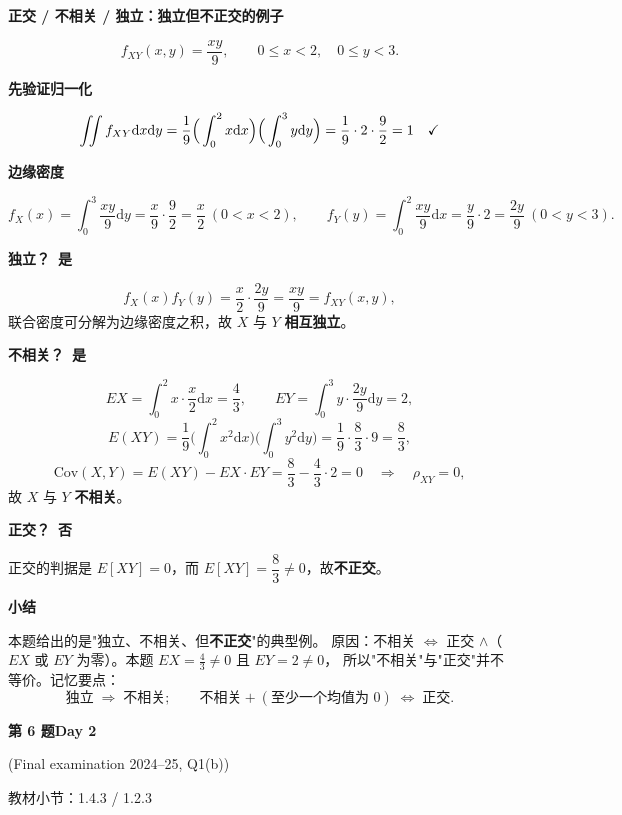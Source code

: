 \documentclass[10.5pt,fontset=fandol]{ctexart}
\newcommand{\key}[1]{\par\vspace{4pt}\noindent\textbf{\color{navy}#1}\par\vspace{2pt}}
\newcommand{\dd}{\mathrm d}\newcommand{\Var}{\operatorname{Var}}\newcommand{\Cov}{\operatorname{Cov}}
\newcommand{\qtitle}[2]{\par\addvspace{1.2em}\Needspace{8\baselineskip}\begin{tcolorbox}[colback=navy,colframe=navy,arc=1.5pt,boxrule=0pt]\color{white}\large\bfseries #1\hfill\small #2\end{tcolorbox}}
\begin{document}
\noindent\textbf{正交 / 不相关 / 独立：独立但不正交的例子}\par\smallskip\begin{tcolorbox}[breakable,colback=qbg,colframe=qbg,boxrule=0pt]\[
f_{XY}(x,y)=\frac{xy}{9},\qquad 0\le x<2,\quad 0\le y<3 .
\]

\key{先验证归一化}
\[
\iint f_{XY}\dd x\dd y=\frac19\Big(\int_0^2x\dd x\Big)\Big(\int_0^3y\dd y\Big)=\frac19\cdot2\cdot\frac92=1 \quad\text{\checkmark}
\]

\key{边缘密度}
\[
f_X(x)=\int_0^3\frac{xy}{9}\dd y=\frac{x}{9}\cdot\frac92=\frac{x}{2}\ (0<x<2),
\qquad
f_Y(y)=\int_0^2\frac{xy}{9}\dd x=\frac{y}{9}\cdot2=\frac{2y}{9}\ (0<y<3).
\]

\key{独立？\ 是}
\[
f_X(x)f_Y(y)=\frac{x}{2}\cdot\frac{2y}{9}=\frac{xy}{9}=f_{XY}(x,y),
\]
联合密度可分解为边缘密度之积，故 $X$ 与 $Y$ \textbf{相互独立}。

\key{不相关？\ 是}
\[
EX=\int_0^2x\cdot\frac{x}{2}\dd x=\frac43,\qquad
EY=\int_0^3y\cdot\frac{2y}{9}\dd y=2,
\]
\[
E(XY)=\frac19\Big(\int_0^2x^2\dd x\Big)\Big(\int_0^3y^2\dd y\Big)=\frac19\cdot\frac83\cdot9=\frac83,
\]
\[
\mathrm{Cov}(X,Y)=E(XY)-EX\cdot EY=\frac83-\frac43\cdot2=0
\quad\Longrightarrow\quad \rho_{XY}=0,
\]
故 $X$ 与 $Y$ \textbf{不相关}。

\key{正交？\ 否}
正交的判据是 $E[XY]=0$，而 $E[XY]=\dfrac83\neq0$，故\textbf{不正交}。

\key{小结}
本题给出的是"独立、不相关、但\textbf{不正交}"的典型例。
原因：不相关 $\Leftrightarrow$ 正交 $\wedge$（$EX$ 或 $EY$ 为零）。本题 $EX=\tfrac43\neq0$ 且 $EY=2\neq0$，
所以"不相关"与"正交"并不等价。记忆要点：
\[
\text{独立}\;\Longrightarrow\;\text{不相关};\qquad
\text{不相关}+(\text{至少一个均值为 }0)\;\Longleftrightarrow\;\text{正交}.
\]
\end{tcolorbox}
\qtitle{第 6 题}{Day 2}
{\small\color{accentred}(Final examination 2024--25, Q1(b))}\par\smallskip
{\small\color{muted}教材小节：1.4.3 / 1.2.3}\par\medskip
\end{document}
